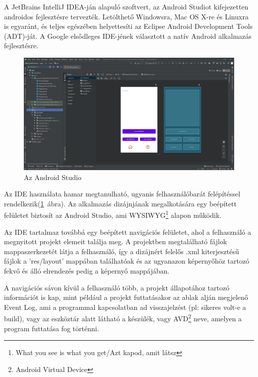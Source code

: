 \documentclass[]{thesis-ekf}
\theoremstyle{definition}
\begin{document}
A JetBrains IntelliJ IDEA-ján alapuló szoftvert, az Android Studiot kifejezetten androidos fejlesztésre tervezték. Letölthető Windowsra, Mac OS X-re és Linuxra is egyaránt, és teljes egészében helyettesíti az Eclipse Android Development Tools (ADT)-ját. A Google elsődleges IDE-jének választott a natív Android alkalmazás fejlesztésre.
\begin{figure}[h]
	\centering
	\includegraphics[width=\linewidth]{images/android/android_ide}
	\caption{Az Android Studio}
	\label{android_ide}
\end{figure}

Az IDE használata hamar megtanulható, ugyanis felhasználóbarát felépítéssel rendelkezik(\ref{android_ide}~ábra). Az alkalmazás dizájnjának megalkotására egy beépített felületet biztosít az Android Studio, ami WYSIWYG\footnote{What you see is what you get/Azt kapod, amit látsz} alapon működik.

Az IDE tartalmaz továbbá egy beépített navigációs felületet, ahol a felhasználó a megnyitott projekt elemeit találja meg. A projektben megtalálható fájlok mappaszerkezetét látja a felhasználó, így a dizájnért felelős .xml kiterjesztésű fájlok a 'res/layout' mappában találhatóak és az ugyanazon képernyőhöz tartozó fekvő és álló elrendezés pedig a képernyő mappájában.

A navigációs sávon kívül a felhasználó több, a projekt állapotához tartozó információt is kap, mint például a projekt futtatásakor az ablak alján megjelenő Event Log, ami a programmal kapcsolatban ad visszajelzést (pl: sikeres volt-e a build), vagy az eszköztár alatt látható a készülék, vagy AVD\footnote{Android Virtual Device} neve, amelyen a program futtatása fog történni.
\end{document}
